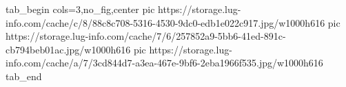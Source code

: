  
 
 
 
 


\ifcmt
  tab_begin cols=3,no_fig,center
     pic https://storage.lug-info.com/cache/c/8/88c8c708-5316-4530-9dc0-edb1e022c917.jpg/w1000h616%
		 pic https://storage.lug-info.com/cache/7/6/257852a9-5bb6-41ed-891c-cb794beb01ac.jpg/w1000h616%
		 pic https://storage.lug-info.com/cache/a/7/3cd844d7-a3ea-467e-9bf6-2eba1966f535.jpg/w1000h616%
  tab_end
\fi
